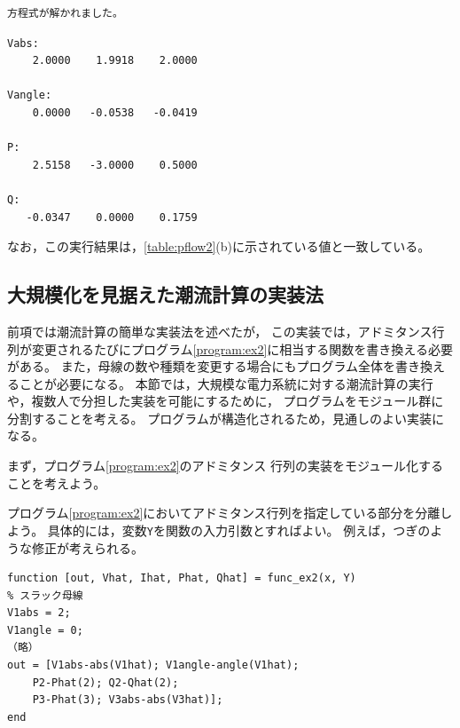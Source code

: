 \documentclass[tombow,dvipdfmx]{corona-a5-1.1}
\begin{document}
{\begin{例}[潮流計算の実装法]
\begin{実行結果}
\begin{verbatim}
方程式が解かれました。
\end{verbatim}
\omitcode
\begin{verbatim}
Vabs:
    2.0000    1.9918    2.0000

Vangle:
    0.0000   -0.0538   -0.0419

P:
    2.5158   -3.0000    0.5000

Q:
   -0.0347    0.0000    0.1759
\end{verbatim}
\end{実行結果}

なお，この実行結果は，\ref{table:pflow2}(b)に示されている値と一致している。
\end{例}

\subsection{大規模化を見据えた潮流計算の実装法}
前項では潮流計算の簡単な実装法を述べたが，
この実装では，アドミタンス行列が変更されるたびにプログラム\ref{program:ex2}に相当する関数を書き換える必要がある。
また，母線の数や種類を変更する場合にもプログラム全体を書き換えることが必要になる。
本節では，大規模な電力系統に対する潮流計算の実行や，複数人で分担した実装を可能にするために，
プログラムをモジュール群に分割することを考える。
プログラムが構造化されるため，見通しのよい実装になる。

まず，プログラム\nobreak\ref{program:ex2}のアドミタンス
行列の実装をモジュール化することを考えよう。

\begin{例}[アドミタンス行列の実装の分離]

プログラム\nobreak\ref{program:ex2}においてアドミタンス行列を指定している部分を分離しよう。
具体的には，変数\verb|Y|を関数の入力引数とすればよい。
例えば，つぎのような修正が考えられる。

\smallskip
\begin{PROGRAMA}[count, title={func\_ex3.m}]\label{program:ex3}
\begin{verbatim}
function [out, Vhat, Ihat, Phat, Qhat] = func_ex2(x, Y)
% スラック母線
V1abs = 2;
V1angle = 0;
（略）
out = [V1abs-abs(V1hat); V1angle-angle(V1hat);
    P2-Phat(2); Q2-Qhat(2);
    P3-Phat(3); V3abs-abs(V3hat)];
end
\end{verbatim}
\end{PROGRAMA}


\end{例}}
\end{document}
